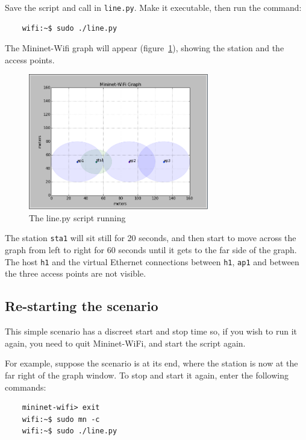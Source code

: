 

Save the script and call in \texttt{line.py}. Make it executable, then run the command:

\begin{verbatim}
    wifi:~$ sudo ./line.py
\end{verbatim} 

The Mininet-Wifi graph will appear (figure~\ref{fig:linescript}), showing the station and the access points. 

\begin{figure}[!b]
    \centering
    \includegraphics[width=0.7\textwidth]{Pictures/mn-wifi-graph-100}
    \caption{The line.py script running}
    \label{fig:linescript}
\end{figure}

The station \texttt{sta1} will sit still for 20 seconds, and then start to move across the graph from left to right for 60 seconds until it gets to the far side of the graph. The host \texttt{h1} and the virtual Ethernet connections between \texttt{h1}, \texttt{ap1} and between the three access points are not visible.

\subsection{Re-starting the scenario}

This simple scenario has a discreet start and stop time so, if you wish to run it again, you need to quit Mininet-WiFi, and start the script again. 

For example, suppose the scenario is at its end, where the station is now at the far right of the graph window. To stop and start it again, enter the following commands:

\begin{verbatim}
    mininet-wifi> exit
    wifi:~$ sudo mn -c
    wifi:~$ sudo ./line.py
\end{verbatim}    

